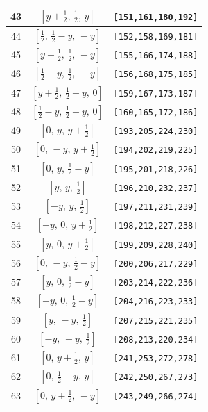 \documentclass[fleqn,8pt]{jsarticle}
\begin{document}
\begin{longtable}{ccc}
43 & $\left[ y + \frac{1}{2},\, \frac{1}{2},\, y \right]$ & {\tt [151,161,180,192]} \\ \hline
44 & $\left[ \frac{1}{2},\, \frac{1}{2} - y,\, - y \right]$ & {\tt [152,158,169,181]} \\ \hline
45 & $\left[ y + \frac{1}{2},\, \frac{1}{2},\, - y \right]$ & {\tt [155,166,174,188]} \\ \hline
46 & $\left[ \frac{1}{2} - y,\, \frac{1}{2},\, - y \right]$ & {\tt [156,168,175,185]} \\ \hline
47 & $\left[ y + \frac{1}{2},\, \frac{1}{2} - y,\, 0 \right]$ & {\tt [159,167,173,187]} \\ \hline
48 & $\left[ \frac{1}{2} - y,\, \frac{1}{2} - y,\, 0 \right]$ & {\tt [160,165,172,186]} \\ \hline
49 & $\left[ 0,\, y,\, y + \frac{1}{2} \right]$ & {\tt [193,205,224,230]} \\ \hline
50 & $\left[ 0,\, - y,\, y + \frac{1}{2} \right]$ & {\tt [194,202,219,225]} \\ \hline
51 & $\left[ 0,\, y,\, \frac{1}{2} - y \right]$ & {\tt [195,201,218,226]} \\ \hline
52 & $\left[ y,\, y,\, \frac{1}{2} \right]$ & {\tt [196,210,232,237]} \\ \hline
53 & $\left[ - y,\, y,\, \frac{1}{2} \right]$ & {\tt [197,211,231,239]} \\ \hline
54 & $\left[ - y,\, 0,\, y + \frac{1}{2} \right]$ & {\tt [198,212,227,238]} \\ \hline
55 & $\left[ y,\, 0,\, y + \frac{1}{2} \right]$ & {\tt [199,209,228,240]} \\ \hline
56 & $\left[ 0,\, - y,\, \frac{1}{2} - y \right]$ & {\tt [200,206,217,229]} \\ \hline
57 & $\left[ y,\, 0,\, \frac{1}{2} - y \right]$ & {\tt [203,214,222,236]} \\ \hline
58 & $\left[ - y,\, 0,\, \frac{1}{2} - y \right]$ & {\tt [204,216,223,233]} \\ \hline
59 & $\left[ y,\, - y,\, \frac{1}{2} \right]$ & {\tt [207,215,221,235]} \\ \hline
60 & $\left[ - y,\, - y,\, \frac{1}{2} \right]$ & {\tt [208,213,220,234]} \\ \hline
61 & $\left[ 0,\, y + \frac{1}{2},\, y \right]$ & {\tt [241,253,272,278]} \\ \hline
62 & $\left[ 0,\, \frac{1}{2} - y,\, y \right]$ & {\tt [242,250,267,273]} \\ \hline
63 & $\left[ 0,\, y + \frac{1}{2},\, - y \right]$ & {\tt [243,249,266,274]} \\ \hline

\end{longtable}
\end{document}
